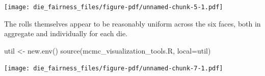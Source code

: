 \documentclass[
  letterpaper,
  DIV=11,
  numbers=noendperiod]{scrartcl}
\newenvironment{Shaded}{\begin{snugshade}}{\end{snugshade}}
\newcommand{\AttributeTok}[1]{\textcolor[rgb]{0.40,0.45,0.13}{#1}}
\newcommand{\DecValTok}[1]{\textcolor[rgb]{0.68,0.00,0.00}{#1}}
\newcommand{\FloatTok}[1]{\textcolor[rgb]{0.68,0.00,0.00}{#1}}
\newcommand{\FunctionTok}[1]{\textcolor[rgb]{0.28,0.35,0.67}{#1}}
\newcommand{\NormalTok}[1]{\textcolor[rgb]{0.00,0.23,0.31}{#1}}
\newcommand{\OtherTok}[1]{\textcolor[rgb]{0.00,0.23,0.31}{#1}}
\newcommand{\SpecialCharTok}[1]{\textcolor[rgb]{0.37,0.37,0.37}{#1}}
\newcommand{\StringTok}[1]{\textcolor[rgb]{0.13,0.47,0.30}{#1}}
\begin{document}
\texttt{[image: die\_fairness\_files/figure-pdf/unnamed-chunk-5-1.pdf]}

The rolls themselves appear to be reasonably uniform across the six
faces, both in aggregate and individually for each die.

\begin{Shaded}
\begin{Highlighting}[]
\NormalTok{util }\OtherTok{\textless{}{-}} \FunctionTok{new.env}\NormalTok{()}
\FunctionTok{source}\NormalTok{(}\StringTok{\textquotesingle{}mcmc\_visualization\_tools.R\textquotesingle{}}\NormalTok{, }\AttributeTok{local=}\NormalTok{util)}
\end{Highlighting}
\end{Shaded}

\begin{Shaded}
\end{Shaded}

\texttt{[image: die\_fairness\_files/figure-pdf/unnamed-chunk-7-1.pdf]}
\end{document}
